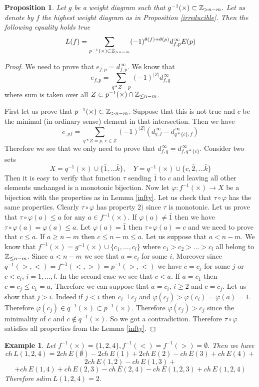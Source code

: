 \documentclass[12pt,reqno]{amsart}
\newtheorem{proposition}[thm]{Proposition}
\newtheorem{example}[thm]{Example}
\begin{document}
\begin{proposition}\label{euler1} Let $g$ be a weight diagram such that $g^{-1}(\times)\subset \Bbb Z_{>n-m}.$ Let us denote by $f$ the  highest weight diagram as in Proposition \ref{irreducible}.  Then the following equality holds true
$$
L(f)=\sum_{p^{-1}(\times)\subset \Bbb Z_{>n-m}}(-1)^{\theta(f)+\theta(p)}d^{\,\infty}_{f,p}E(p)
$$
\end{proposition}
\begin{proof} We need to prove that $e_{f,p}=d^{\,\infty}_{f,p}$. We know that 
$$
e_{f,p}=\sum_{q*Z=p}(-1)^{|Z|}d^{\,\infty}_{f,q}
$$
where  sum is taken over all $Z\subset p^{-1}(\times)\cap\Bbb Z_{\le n-m}$.

First let us prove that $p^{-1}(\times)\subset \Bbb Z_{>n-m}$. Suppose that this is not true and $c$ be the minimal (in ordinary sense) element in that intersection. Then we have 
$$
e_{,pf}=\sum_{q*Z=p,\,c\in Z}(-1)^{|Z|}(d^{\,\infty}_{q,f}-d^{\,\infty}_{q*\{c\},f})
$$
Therefore we see that we only need to prove that  $d^{\,\infty}_{f,q}=d^{\,\infty}_{f,q*\{c\}}$. Consider two sets
$$
X=q^{-1}(\times)\cup\{\bar1,\dots\bar k\},\quad Y=q^{-1}(\times)\cup\{c,\bar2,\dots\bar k\}
$$
Then it is easy to verify that function $\tau$  sending $\bar1$ to $c$ and leaving  all other elements unchanged is a monotonic bijection. 
Now let $\varphi: f^{-1}(\times)\rightarrow X$ be a bijection  with the properties as in Lemma \ref{infty}. Let us check that $\tau\circ\varphi$ has the same properties. Clearly $\tau\circ\varphi$  has property $2)$ since $\tau$ is monotonic. Let us prove that $\tau\circ\varphi(a)\le a$ for any $a\in f^{-1}(\times)$. If $\varphi(a)\ne \bar1$ then we have $\tau\circ\varphi(a)=\varphi(a)\le a$. Let $\varphi(a)=\bar1$ then  $\tau\circ\varphi(a)=c$ and we need to prove that $c\le a$. If $a\ge n-m$ then $c\le n-m\le a$. Let us suppose that $a<n-m$. We know that 
$f^{-1}(\times)=g^{-1}(\times)\cup\{c_1,\dots,c_l\}$ where $c_1>c_2>\dots>c_l$ all   belong to $\Bbb Z_{\le n-m}$. Since $a<n-m$ we see that $a=c_i$ for some $i$. Moreover since $q^{-1}(>,<)=f^{-1}(<,>)=p^{-1}(>,<)$ we have $c=c_j$ for some $j$ or $c<c_i,\,i=1,\dots,l$. In the second case we see that $c<a$. If $a=c_1$ then $c=c_j\le c_1=a$, Therefore we can suppose that $a=c_i,\, i\ge2$ and $c=c_j$. Let us show that $j>i$. Indeed if $j<i$ then $c_i\dashv c_j$ and $\varphi(c_j)>\varphi(c_i)=\varphi(a)=\bar1$. Therefore $\varphi(c_j)\in q^{-1}(\times)\subset p^{-1}(\times)$. Therefore $\varphi(c_j)>c_j$ since the minimality of $c$ and $c\notin q^{-1}(\times)$. So we got a contradiction. 
Therefore $\tau\circ\varphi$ satisfies all properties from the Lemma \ref{infty}.
\end{proof}
\begin{example} Let $f^{-1}(\times)=\{1,2,4\},f^{-1}(<)=f^{-1}(>)=\emptyset.$ Then we have
$$
ch\,L(1,2,4)=2ch\,E(\emptyset)-2ch\,E(1)+2ch\,E(2)-ch\,E(3)+ch\,E(4)+
$$
$$
2ch\,E(1,2)-ch\,E(1,3)+
$$
$$
+ch\,E(1,4)+ch\,E(2,3)-ch\,E(2,4)-ch\,E(1,2,3)+ch\,E(1,2,4)
$$
Therefore $sdim\, L(1,2,4)=2$. 
\end{example}
\end{document}
